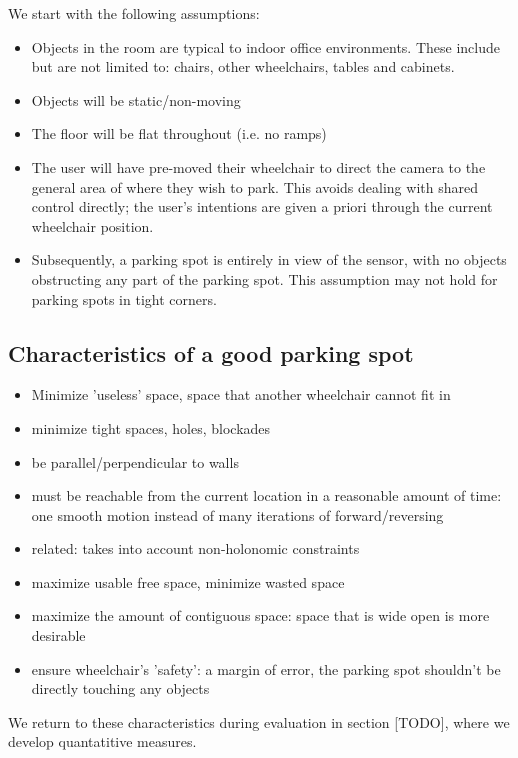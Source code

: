 We start with the following assumptions:
\begin{itemize}
\item Objects in the room are typical to indoor office environments. These
include but are not limited to: chairs, other wheelchairs, tables and cabinets.
\item Objects will be static/non-moving
\item The floor will be flat throughout (i.e. no ramps)
\item The user will have pre-moved their wheelchair to direct the camera to the
general area of where they wish to park. This avoids dealing with shared control
directly; the user's intentions are given a priori through the current
wheelchair position.
\item Subsequently, a
parking spot is entirely in view of the sensor, with no objects obstructing any
part of the parking spot. This assumption may not hold for parking spots in
tight corners.
\end{itemize}


\subsection{Characteristics of a good parking spot}
\begin{itemize}
\item Minimize 'useless' space, space that another wheelchair cannot fit in 
\item minimize tight spaces, holes, blockades
\item be parallel/perpendicular to walls
\item must be reachable from the current location in a reasonable amount of
time: one smooth motion instead of many iterations of forward/reversing
\item related: takes into account non-holonomic constraints
\item maximize usable free space, minimize wasted space
\item maximize the amount of contiguous space: space that is wide open is more
desirable
\item ensure wheelchair's 'safety': a margin of error, the parking spot
shouldn't be directly touching any objects
\end{itemize}

We return to these characteristics during evaluation in section [TODO], where we
develop quantatitive measures.



